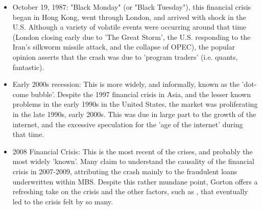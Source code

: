 \documentclass[12pt]{article}
\begin{document}
		\begin{itemize}
		
			\item October 19, 1987: "Black Monday" (or "Black Tuesday"), this financial crisis began in Hong Kong, went through London, and arrived with shock in the U.S.
					  Although a variety of volatile events were occurring around that time (London closing early due to 'The Great Storm', the U.S. responding to the Iran's
					  silkworm missile attack, and the collapse of OPEC), the popular opinion asserts that the crash was due to 'program traders' (i.e. quants, fantastic). 
					  
			\item Early 2000s recession: This is more widely, and informally, known as the 'dot-come bubble'. Despite the 1997 financial crisis in Asia, and the lesser known
					  problems in the early 1990s in the United States, the market was proliferating in the late 1990s, early 2000s. This was due in large part to the growth of the
					  internet, and the excessive speculation for the 'age of the internet' during that time. 
					  
			\item 2008 Financial Crisis: This is the most recent of the crises, and probably the most widely 'known'. Many claim to understand the causality of the financial crisis 
					  in 2007-2009, attributing the crash mainly to the fraudulent loans underwritten within MBS. Despite this rather mundane point, Gorton offers a refreshing take 
					  on the crisis and the other factors, such as , that eventually led to the crisis felt by so many.
		
		\end{itemize}				
		
		
		
		
\end{document}
